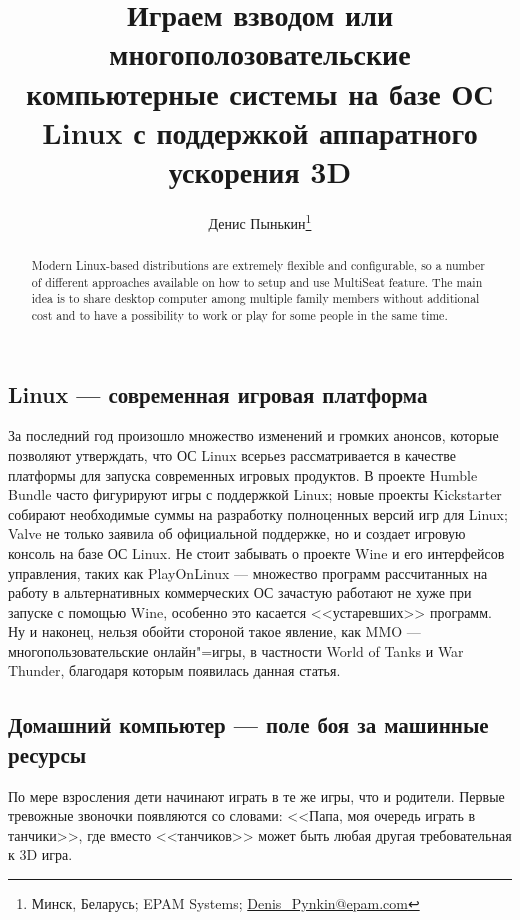 \documentclass[10pt, a5paper]{article}
\begin{document}
\title{Играем взводом или многополозовательские компьютерные системы на базе ОС Linux с поддержкой аппаратного ускорения 3D}

\author{Денис Пынькин\footnote{Минск, Беларусь; EPAM Systems; \url{Denis_Pynkin@epam.com}}}
\maketitle

\begin{abstract}
	Modern Linux-based distributions are extremely flexible and configurable, so a number of different approaches available on how to setup and use MultiSeat feature. The main idea is to share desktop computer among multiple family members without additional cost and to have a possibility to work or play for some people in the same time.
\end{abstract}

\subsection*{Linux --- современная игровая платформа}

За последний год произошло множество изменений и громких анонсов, которые позволяют
утверждать, что ОС Linux всерьез рассматривается в качестве платформы для запуска 
современных игровых продуктов. 
В проекте Humble Bundle часто фигурируют игры с поддержкой Linux; новые проекты Kickstarter
собирают необходимые суммы на разработку полноценных версий игр для Linux; Valve не только заявила
об официальной поддержке, но и создает игровую консоль на базе ОС Linux.
Не стоит забывать о проекте Wine и его интерфейсов управления, таких как PlayOnLinux --- множество 
программ рассчитанных на работу в альтернативных коммерческих ОС зачастую работают не хуже 
при запуске с помощью Wine, особенно это касается <<устаревших>> программ.
Ну и наконец, нельзя обойти стороной такое явление, как MMO --- многопользовательские онлайн"=игры,
в частности World of Tanks и War Thunder, благодаря которым появилась данная статья. 

\subsection*{Домашний компьютер --- поле боя за машинные ресурсы}

По мере взросления дети начинают играть в те же игры, что и родители. 
Первые тревожные звоночки появляются со словами: <<Папа, моя очередь играть в танчики>>,
где вместо <<танчиков>> может быть любая другая требовательная к 3D игра.
\end{document}
